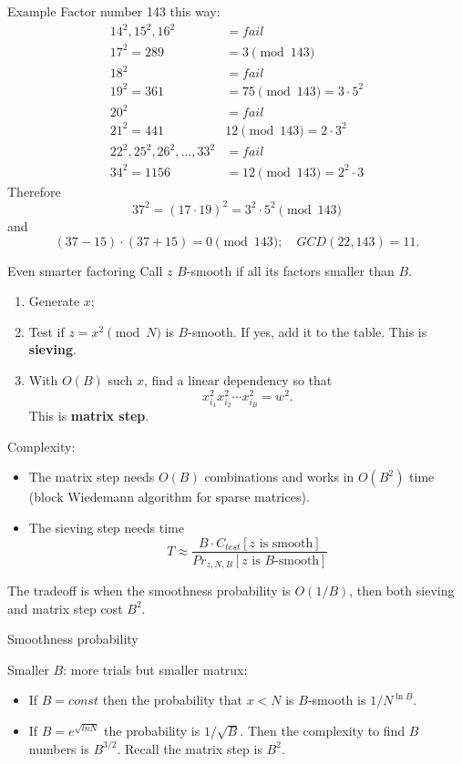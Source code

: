 \documentclass[t]{beamer}
\begin{document}
\begin{frame}{Example}
    Factor number 143 this way:
    \begin{align*}
        14^2, 15^2, 16^2 &= fail\\
        17^2 = 289 &= 3\pmod{143}\\
        18^2 &=fail\\
        19^2 = 361 &= 75\pmod{143} = 3\cdot 5^2\\
        20^2 &=fail\\
        21^2 =441 &12\pmod{143} = 2\cdot 3^2\\
        22^2, 25^2, 26^2, \ldots, 33^2 &=fail\\
        34^2 =1156&=12\pmod{143} = 2^2\cdot 3
    \end{align*}
  \pause  Therefore
    $$
   37^2 =  (17\cdot 19)^2 = 3^2 \cdot 5^2 \pmod{143}
    $$
    and 
    $$
    (37-15)\cdot(37+15) = 0\pmod{143}; \quad GCD(22,143) = 11.
    $$
\end{frame}

\begin{frame}{Even smarter factoring}
Call $z$ $B$-smooth if all its factors smaller than $B$.
\begin{enumerate}
    \item Generate $x$;
    \item Test if $z=x^2 \pmod{N}$ is $B$-smooth. If yes, add it to the table. This is \textbf{sieving}.
    \item With $O(B)$ such $x$, find a linear dependency so that
    $$
    x_{i_1}^2x_{i_2}^2\cdots x_{i_B}^2 = w^2.
    $$
    This is \textbf{matrix step}.
\end{enumerate}
\pause Complexity:
\begin{itemize}
    \item The matrix step needs $O(B)$ combinations and works in $O(B^2)$ time (block Wiedemann algorithm for sparse matrices).
    \item The sieving step needs time 
    $$
    T\approx \frac{B\cdot C_{test}[z\text{ is smooth}]}{Pr_{z,N,B}[z\text{ is $B$-smooth}]}
    $$
\end{itemize}

The tradeoff is when the smoothness probability is $O(1/B)$, then both sieving and matrix step cost  $B^2$.
     
    

\end{frame}

\begin{frame}{Smoothness probability}


Smaller $B$: more trials but smaller matrux:
\begin{itemize}
    \item If $B=const$ then the probability that $x<N$ is $B$-smooth is $1/N^{\ln B}$.
    \item If $B = e^{\sqrt{ln N}}$ the probability is $1/\sqrt{B}$. Then the complexity to find $B$ numbers is $B^{3/2}$. Recall the matrix step is $B^2$.
\end{itemize}

\end{frame}
\end{document}
